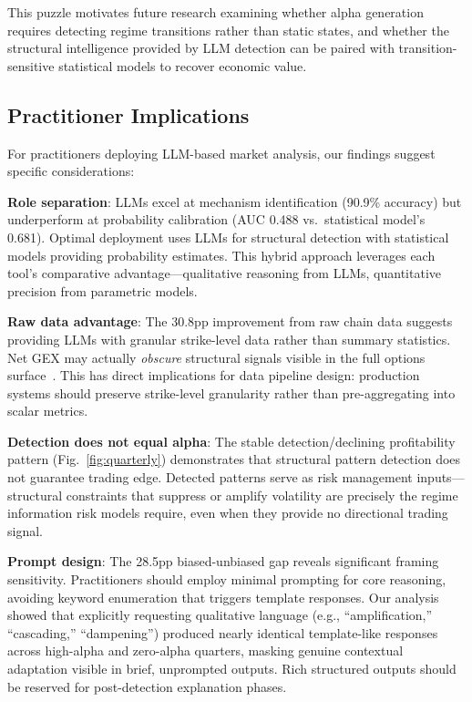 This puzzle motivates future research examining whether alpha generation requires detecting regime transitions rather than static states, and whether the structural intelligence provided by LLM detection can be paired with transition-sensitive statistical models to recover economic value.

\subsection{Practitioner Implications}

For practitioners deploying LLM-based market analysis, our findings suggest specific considerations:

\textbf{Role separation}: LLMs excel at mechanism identification (90.9\% accuracy) but underperform at probability calibration (AUC 0.488 vs.\ statistical model's 0.681). Optimal deployment uses LLMs for structural detection with statistical models providing probability estimates. This hybrid approach leverages each tool's comparative advantage---qualitative reasoning from LLMs, quantitative precision from parametric models.

\textbf{Raw data advantage}: The 30.8pp improvement from raw chain data suggests providing LLMs with granular strike-level data rather than summary statistics. Net GEX may actually \textit{obscure} structural signals visible in the full options surface~\cite{hayek1945}. This has direct implications for data pipeline design: production systems should preserve strike-level granularity rather than pre-aggregating into scalar metrics.

\textbf{Detection does not equal alpha}: The stable detection/declining profitability pattern (Fig.~\ref{fig:quarterly}) demonstrates that structural pattern detection does not guarantee trading edge. Detected patterns serve as risk management inputs---structural constraints that suppress or amplify volatility are precisely the regime information risk models require, even when they provide no directional trading signal.

\textbf{Prompt design}: The 28.5pp biased-unbiased gap reveals significant framing sensitivity. Practitioners should employ minimal prompting for core reasoning, avoiding keyword enumeration that triggers template responses. Our analysis showed that explicitly requesting qualitative language (e.g., ``amplification,'' ``cascading,'' ``dampening'') produced nearly identical template-like responses across high-alpha and zero-alpha quarters, masking genuine contextual adaptation visible in brief, unprompted outputs. Rich structured outputs should be reserved for post-detection explanation phases.

